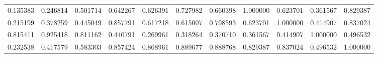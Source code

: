 \begin{table}
\begin{tabular}{lcr}
0.135383 & 0.246814 & 0.501714 & 0.642267 & 0.626391 & 0.727982 & 0.660398 & 1.000000 & 0.623701 & 0.361567 & 0.829387 \\
0.215199 & 0.378259 & 0.445049 & 0.857791 & 0.617218 & 0.615007 & 0.798593 & 0.623701 & 1.000000 & 0.414907 & 0.837024 \\
0.815411 & 0.925418 & 0.811162 & 0.440791 & 0.269961 & 0.318264 & 0.370710 & 0.361567 & 0.414907 & 1.000000 & 0.496532 \\
0.232538 & 0.417579 & 0.583303 & 0.857424 & 0.868961 & 0.889677 & 0.888768 & 0.829387 & 0.837024 & 0.496532 & 1.000000 \\
\bottomrule
\end{tabular}
\end{table}
